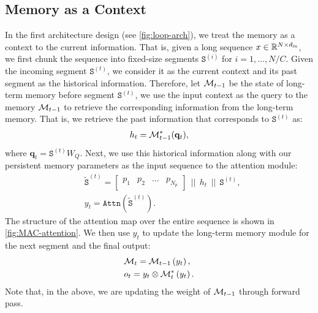 \subsection{Memory as a Context}
In the first architecture design (see \autoref{fig:loop-arch}), we treat the memory as a context to the current information. That is, given a long sequence $x \in \mathbb{R}^{N \times d_{\text{in}}}$, we first chunk the sequence into fixed-size segments $\texttt{S}^{(i)}$ for $i = 1, \dots, N/C$. Given the incoming segment $\texttt{S}^{(t)}$, we consider it as the current context and its past segment as the historical information. Therefore, let $\mathcal{M}_{t-1}$ be the state of long-term memory before segment $\texttt{S}^{(t)}$, we use the input context as the query to the memory $\mathcal{M}_{t-1}$ to retrieve the corresponding information from the long-term memory. That is, we retrieve the past information that corresponds to $\texttt{S}^{(t)}$ as:
\begin{align}
    h_{t} = \mathcal{M}^{*}_{t-1} (\mathbf{q}_{t}),  
\end{align}
where $\mathbf{q}_{t} = \texttt{S}^{(t)} W_Q$. Next, we use this historical information along with our persistent memory parameters as the input sequence to the attention module:
\begin{align}
    &\tilde{\texttt{S}}^{(t)} = \begin{bmatrix}
    p_1 & p_2 & \dots & p_{N_p}
\end{bmatrix} \:\: || \:\: h_{t}  \:\: || \:\: \texttt{S}^{(t)},\\
&y_t = \texttt{Attn}\left( \tilde{\texttt{S}}^{(t)} \right).  
\end{align}
The structure of the attention map over the entire sequence is shown in \autoref{fig:MAC-attention}. We then use $y_t$ to update the long-term memory module for the next segment and the final output:
\begin{align}
    &\mathcal{M}_{t} = \mathcal{M}_{t-1}\left( y_t \right), \\
    &o_t = y_t \otimes  \mathcal{M}_{t}^{*}\left( y_t \right).
\end{align}
Note that, in the above, we are updating the weight of $\mathcal{M}_{t-1}$ through forward pass. 


